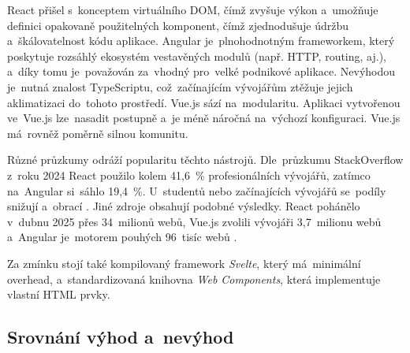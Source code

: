 React přišel s~konceptem virtuálního DOM, čímž zvyšuje výkon a~umožňuje
definici opakovaně použitelných komponent, čímž zjednodušuje údržbu
a~škálovatelnost kódu aplikace. Angular je~plnohodnotným frameworkem, který
poskytuje rozsáhlý ekosystém vestavěných modulů (např. HTTP, routing, aj.),
a~díky tomu je~považován za~vhodný pro~velké podnikové aplikace. Nevýhodou
je~nutná znalost TypeScriptu, což~začínajícím vývojářům ztěžuje jejich
aklimatizaci do~tohoto prostředí. Vue.js sází na~modularitu. Aplikaci
vytvořenou ve~Vue.js lze~nasadit postupně a~je méně náročná na~výchozí
konfiguraci. Vue.js má~rovněž poměrně silnou komunitu.
\cite{YHVfLHsNlUItkF6G,1WL9hIh67tHjtVTy} %

Různé průzkumy odráží popularitu těchto nástrojů. Dle~průzkumu StackOverflow
z~roku 2024 React použilo kolem 41,6~\% profesionálních vývojářů, zatímco
na~Angular si~sáhlo 19,4~\%. U~studentů nebo začínajících vývojářů se~podíly
snižují a~obrací \cite{YHVfLHsNlUItkF6G,w6F4OYb0neliWLGP}. %
Jiné zdroje obsahují podobné výsledky. React pohánělo v~dubnu 2025
přes 34~milionů webů, Vue.js zvolili vývojáři 3,7~milionu webů a~Angular
je~motorem pouhých 96~tisíc webů \cite{YHVfLHsNlUItkF6G,1WL9hIh67tHjtVTy}.

Za zmínku stojí také kompilovaný framework \emph{Svelte}, který
má~minimální overhead, a~standardizovaná knihovna \emph{Web Components},
která implementuje vlastní HTML prvky.

\subsection{Srovnání výhod a~nevýhod}
\label{sec:frontend-advatages-disadvantages}

